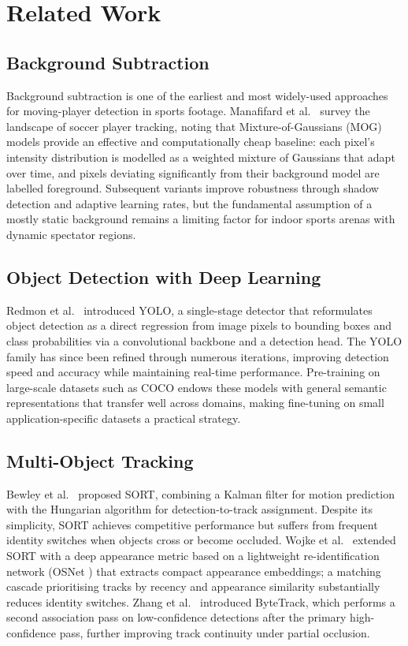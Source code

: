 \section{Related Work}\label{sec:related}

\subsection{Background Subtraction}
Background subtraction is one of the earliest and most widely-used approaches for
moving-player detection in sports footage.
Manafifard et al.\ \cite{survey} survey the landscape of soccer player tracking,
noting that Mixture-of-Gaussians (MOG) models provide an effective and
computationally cheap baseline: each pixel's intensity distribution is modelled as a
weighted mixture of Gaussians that adapt over time, and pixels deviating
significantly from their background model are labelled foreground.
Subsequent variants improve robustness through shadow detection and adaptive
learning rates, but the fundamental assumption of a mostly static background
remains a limiting factor for indoor sports arenas with dynamic spectator regions.

\subsection{Object Detection with Deep Learning}
Redmon et al.\ \cite{yolo_paper} introduced YOLO, a single-stage detector that
reformulates object detection as a direct regression from image pixels to bounding
boxes and class probabilities via a convolutional backbone and a detection head.
The YOLO family \cite{yolo_github} has since been refined through numerous
iterations, improving detection speed and accuracy while maintaining real-time
performance.
Pre-training on large-scale datasets such as COCO endows these models with general
semantic representations that transfer well across domains, making fine-tuning on
small application-specific datasets a practical strategy.

\subsection{Multi-Object Tracking}
Bewley et al.\ \cite{sort} proposed SORT, combining a Kalman filter for motion
prediction with the Hungarian algorithm for detection-to-track assignment.
Despite its simplicity, SORT achieves competitive performance but suffers from
frequent identity switches when objects cross or become occluded.
Wojke et al.\ \cite{deepsort} extended SORT with a deep appearance metric based on
a lightweight re-identification network (OSNet \cite{reid}) that extracts compact
appearance embeddings; a matching cascade prioritising tracks by recency and
appearance similarity substantially reduces identity switches.
Zhang et al.\ \cite{bytetrack} introduced ByteTrack, which performs a second
association pass on low-confidence detections after the primary high-confidence
pass, further improving track continuity under partial occlusion.

